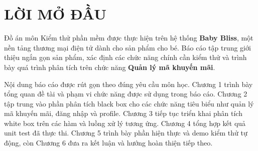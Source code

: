 \newpage
{}
{}
\section*{\textbf{LỜI MỞ ĐẦU}}

Đồ án môn Kiểm thử phần mềm được thực hiện trên hệ thống \textbf{Baby Bliss}, một nền tảng thương mại điện tử dành cho sản phẩm cho bé. Báo cáo tập trung giới thiệu ngắn gọn sản phẩm, xác định các chức năng chính cần kiểm thử và trình bày quá trình phân tích trên chức năng \textbf{Quản lý mã khuyến mãi}.

Nội dung báo cáo được rút gọn theo đúng yêu cầu môn học. Chương 1 trình bày tổng quan đề tài và phạm vi chức năng được sử dụng trong báo cáo. Chương 2 tập trung vào phần phân tích black box cho các chức năng tiêu biểu như quản lý mã khuyến mãi, đăng nhập và profile. Chương 3 tiếp tục triển khai phân tích white box trên các hàm và luồng xử lý tương ứng. Chương 4 tổng hợp kết quả unit test đã thực thi. Chương 5 trình bày phần hiện thực và demo kiểm thử tự động, còn Chương 6 đưa ra kết luận và hướng hoàn thiện tiếp theo.
